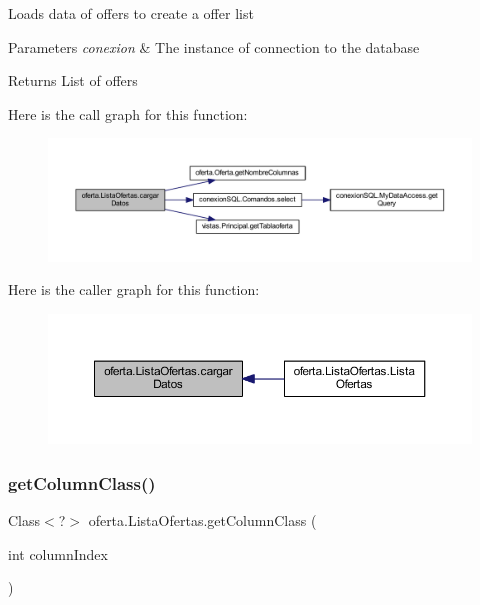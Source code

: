 Loads data of offers to create a offer list 
\begin{DoxyParams}{Parameters}
{\em conexion} & The instance of connection to the database \\
\hline
\end{DoxyParams}
\begin{DoxyReturn}{Returns}
List of offers 
\end{DoxyReturn}
Here is the call graph for this function\+:
\nopagebreak
\begin{figure}[H]
\begin{center}
\leavevmode
\includegraphics[width=350pt]{classoferta_1_1_lista_ofertas_a7ad03e98699edb0253f41109273e350e_cgraph}
\end{center}
\end{figure}
Here is the caller graph for this function\+:
\nopagebreak
\begin{figure}[H]
\begin{center}
\leavevmode
\includegraphics[width=350pt]{classoferta_1_1_lista_ofertas_a7ad03e98699edb0253f41109273e350e_icgraph}
\end{center}
\end{figure}
\mbox{\label{classoferta_1_1_lista_ofertas_a86faae91c71fe103470f039a09213048}} 
\subsubsection{\texorpdfstring{get\+Column\+Class()}{getColumnClass()}}
{\footnotesize\ttfamily Class$<$?$>$ oferta.\+Lista\+Ofertas.\+get\+Column\+Class (\begin{DoxyParamCaption}\item[{int}]{column\+Index }\end{DoxyParamCaption})}

